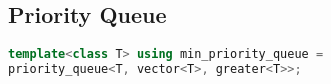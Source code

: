 \subsection{Priority Queue}
\begin{lstlisting}[language=C++]
template<class T> using min_priority_queue =
priority_queue<T, vector<T>, greater<T>>;
\end{lstlisting}